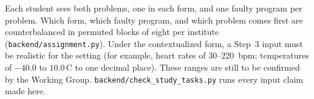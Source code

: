 \documentclass[11pt,a4paper]{article}
\begin{document}
\medskip
Each student sees both problems, one in each form, and one faulty program
per problem. Which form, which faulty program, and which problem comes
first are counterbalanced in permuted blocks of eight per institute
(\texttt{backend/assignment.py}). Under the contextualized form, a Step~3
input must be realistic for the setting (for example, heart rates of
30--220~bpm; temperatures of $-40.0$ to $10.0$\,\textdegree C to one decimal
place). These ranges are still to be confirmed by the Working Group.
\texttt{backend/check\_study\_tasks.py} runs every input claim made here.
\end{document}

